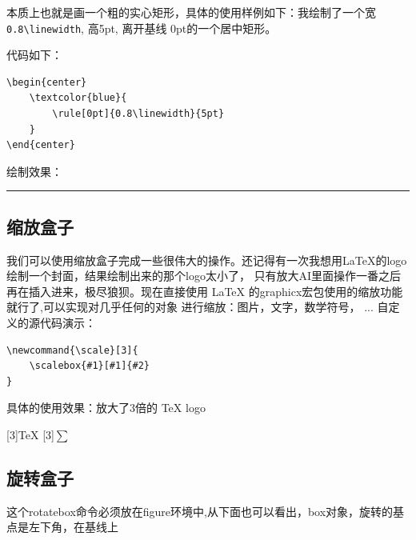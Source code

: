 \documentclass[fontset=windows, 12pt]{article}
\newcommand{\scale}[2]{
    \scalebox{#1}[#1]{#2}
}
\begin{document}
本质上也就是画一个粗的实心矩形，具体的使用样例如下：我绘制了一个宽\verb |0.8\linewidth|, 高5pt, 离开基线 0pt的一个居中矩形。


代码如下：
\begin{verbatim}
\begin{center}
    \textcolor{blue}{
        \rule[0pt]{0.8\linewidth}{5pt}
    }
\end{center}
\end{verbatim}

绘制效果：
\begin{center}
    \textcolor{blue}{
        \rule[0pt]{0.8\linewidth}{5pt}
    }
\end{center}


\subsection{缩放盒子}
我们可以使用缩放盒子完成一些很伟大的操作。还记得有一次我想用LaTeX的logo绘制一个封面，结果绘制出来的那个logo太小了，
只有放大AI里面操作一番之后再在插入进来，极尽狼狈。现在直接使用 LaTeX 的graphicx宏包使用的缩放功能就行了,可以实现对几乎任何的对象
进行缩放：图片，文字，数学符号， ...
自定义的源代码演示：
\begin{verbatim}
\newcommand{\scale}[3]{
    \scalebox{#1}[#1]{#2}
}
\end{verbatim}

具体的使用效果：放大了3倍的 TeX logo

\begin{center}
    \scale{3}{\TeX}\hspace*{0.4\linewidth} \scale{3}{$\sum$}
\end{center}

\subsection{旋转盒子}
这个{\ttfamily rotatebox}命令必须放在figure环境中,从下面也可以看出，box对象，旋转的基点是左下角，在基线上
\end{document}
